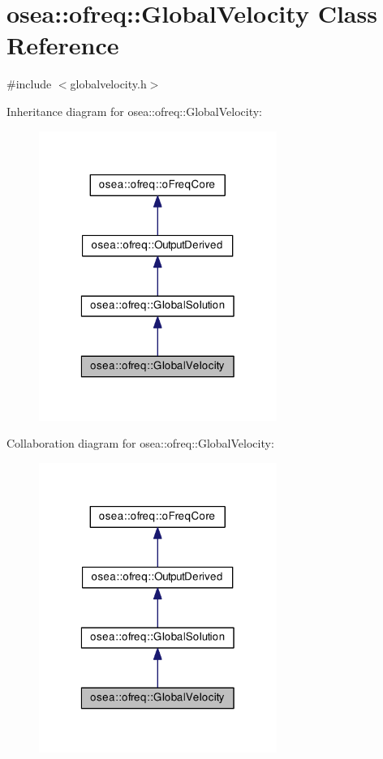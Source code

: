 \hypertarget{classosea_1_1ofreq_1_1_global_velocity}{\section{osea\-:\-:ofreq\-:\-:Global\-Velocity Class Reference}
\label{classosea_1_1ofreq_1_1_global_velocity}
}


{\ttfamily \#include $<$globalvelocity.\-h$>$}



Inheritance diagram for osea\-:\-:ofreq\-:\-:Global\-Velocity\-:
\nopagebreak
\begin{figure}[H]
\begin{center}
\leavevmode
\includegraphics[width=220pt]{classosea_1_1ofreq_1_1_global_velocity__inherit__graph}
\end{center}
\end{figure}


Collaboration diagram for osea\-:\-:ofreq\-:\-:Global\-Velocity\-:
\nopagebreak
\begin{figure}[H]
\begin{center}
\leavevmode
\includegraphics[width=220pt]{classosea_1_1ofreq_1_1_global_velocity__coll__graph}
\end{center}
\end{figure}
